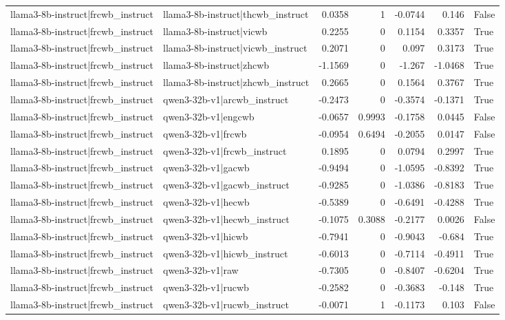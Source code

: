 \begin{table}
\begin{tabular}{l l r r r r l}
llama3-8b-instruct|frcwb_instruct & llama3-8b-instruct|thcwb_instruct & 0.0358 & 1 & -0.0744 & 0.146 & False \\
llama3-8b-instruct|frcwb_instruct & llama3-8b-instruct|vicwb & 0.2255 & 0 & 0.1154 & 0.3357 & True \\
llama3-8b-instruct|frcwb_instruct & llama3-8b-instruct|vicwb_instruct & 0.2071 & 0 & 0.097 & 0.3173 & True \\
llama3-8b-instruct|frcwb_instruct & llama3-8b-instruct|zhcwb & -1.1569 & 0 & -1.267 & -1.0468 & True \\
llama3-8b-instruct|frcwb_instruct & llama3-8b-instruct|zhcwb_instruct & 0.2665 & 0 & 0.1564 & 0.3767 & True \\
llama3-8b-instruct|frcwb_instruct & qwen3-32b-v1|arcwb_instruct & -0.2473 & 0 & -0.3574 & -0.1371 & True \\
llama3-8b-instruct|frcwb_instruct & qwen3-32b-v1|engcwb & -0.0657 & 0.9993 & -0.1758 & 0.0445 & False \\
llama3-8b-instruct|frcwb_instruct & qwen3-32b-v1|frcwb & -0.0954 & 0.6494 & -0.2055 & 0.0147 & False \\
llama3-8b-instruct|frcwb_instruct & qwen3-32b-v1|frcwb_instruct & 0.1895 & 0 & 0.0794 & 0.2997 & True \\
llama3-8b-instruct|frcwb_instruct & qwen3-32b-v1|gacwb & -0.9494 & 0 & -1.0595 & -0.8392 & True \\
llama3-8b-instruct|frcwb_instruct & qwen3-32b-v1|gacwb_instruct & -0.9285 & 0 & -1.0386 & -0.8183 & True \\
llama3-8b-instruct|frcwb_instruct & qwen3-32b-v1|hecwb & -0.5389 & 0 & -0.6491 & -0.4288 & True \\
llama3-8b-instruct|frcwb_instruct & qwen3-32b-v1|hecwb_instruct & -0.1075 & 0.3088 & -0.2177 & 0.0026 & False \\
llama3-8b-instruct|frcwb_instruct & qwen3-32b-v1|hicwb & -0.7941 & 0 & -0.9043 & -0.684 & True \\
llama3-8b-instruct|frcwb_instruct & qwen3-32b-v1|hicwb_instruct & -0.6013 & 0 & -0.7114 & -0.4911 & True \\
llama3-8b-instruct|frcwb_instruct & qwen3-32b-v1|raw & -0.7305 & 0 & -0.8407 & -0.6204 & True \\
llama3-8b-instruct|frcwb_instruct & qwen3-32b-v1|rucwb & -0.2582 & 0 & -0.3683 & -0.148 & True \\
llama3-8b-instruct|frcwb_instruct & qwen3-32b-v1|rucwb_instruct & -0.0071 & 1 & -0.1173 & 0.103 & False \\

\end{tabular}
\end{table}

